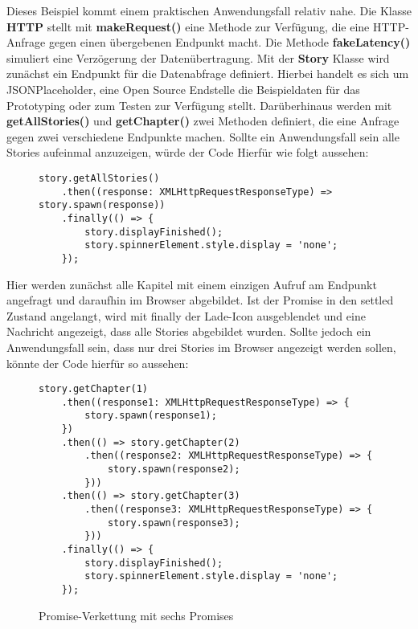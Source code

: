 \noindent
Dieses Beispiel kommt einem praktischen Anwendungsfall relativ nahe. Die Klasse \textbf{HTTP} stellt mit  \textbf{makeRequest()} eine Methode zur Verfügung, die eine HTTP-Anfrage gegen einen übergebenen Endpunkt macht. Die Methode \textbf{fakeLatency()} simuliert eine Verzögerung der Datenübertragung. Mit der \textbf{Story} Klasse wird zunächst ein Endpunkt für die Datenabfrage definiert. Hierbei handelt es sich um JSONPlaceholder, eine Open Source Endstelle die Beispieldaten für das Prototyping oder zum Testen zur Verfügung stellt. Darüberhinaus werden mit \textbf{getAllStories()} und \textbf{getChapter()} zwei Methoden definiert, die eine Anfrage gegen zwei verschiedene Endpunkte machen. Sollte ein Anwendungsfall sein alle Stories aufeinmal anzuzeigen, würde der Code Hierfür wie folgt aussehen:

\begin{figure}[H]
\begin{lstlisting}
story.getAllStories()
    .then((response: XMLHttpRequestResponseType) => story.spawn(response))
    .finally(() => {
        story.displayFinished();
        story.spinnerElement.style.display = 'none';
    });
\end{lstlisting}
\end{figure}

\noindent
Hier werden zunächst alle Kapitel mit einem einzigen Aufruf am Endpunkt angefragt und daraufhin im Browser abgebildet. Ist der Promise in den settled Zustand angelangt, wird mit finally der Lade-Icon ausgeblendet und eine Nachricht angezeigt, dass alle Stories abgebildet wurden. Sollte jedoch ein Anwendungsfall sein, dass nur drei Stories im Browser angezeigt werden sollen, könnte der Code hierfür so aussehen: 

\begin{figure}[H]
\begin{lstlisting}
story.getChapter(1)
    .then((response1: XMLHttpRequestResponseType) => {
        story.spawn(response1);
    })
    .then(() => story.getChapter(2)
        .then((response2: XMLHttpRequestResponseType) => {
            story.spawn(response2);
        }))
    .then(() => story.getChapter(3)
        .then((response3: XMLHttpRequestResponseType) => {
            story.spawn(response3);
        }))
    .finally(() => {
        story.displayFinished();
        story.spinnerElement.style.display = 'none';
    });
\end{lstlisting}
\caption{Promise-Verkettung mit sechs Promises}
\end{figure}


